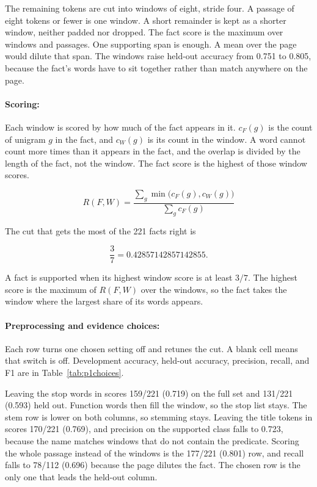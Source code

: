 \documentclass[12pt,a4paper]{article}
\begin{document}
The remaining tokens are cut into windows of eight, stride four. A passage of eight tokens or fewer is one window. A short remainder is kept as a shorter window, neither padded nor dropped. The fact score is the maximum over windows and passages. One supporting span is enough. A mean over the page would dilute that span. The windows raise held-out accuracy from 0.751 to 0.805, because the fact's words have to sit together rather than match anywhere on the page.

\paragraph{Scoring:}

Each window is scored by how much of the fact appears in it. \(c_F(g)\) is the count of unigram \(g\) in the fact, and \(c_W(g)\) is its count in the window. A word cannot count more times than it appears in the fact, and the overlap is divided by the length of the fact, not the window. The fact score is the highest of those window scores.

\begin{equation}
R(F,W)=\frac{\sum_{g}\min\bigl(c_F(g),c_W(g)\bigr)}{\sum_{g}c_F(g)}
\end{equation}

The cut that gets the most of the 221 facts right is

\[
\frac{3}{7} = 0.42857142857142855.
\]

A fact is supported when its highest window score is at least \(3/7\). The highest score is the maximum of \(R(F,W)\) over the windows, so the fact takes the window where the largest share of its words appears.

\paragraph{Preprocessing and evidence choices:}

Each row turns one chosen setting off and retunes the cut. A blank cell means that switch is off. Development accuracy, held-out accuracy, precision, recall, and F1 are in Table~\ref{tab:p1choices}.

Leaving the stop words in scores 159/221 (0.719) on the full set and 131/221 (0.593) held out. Function words then fill the window, so the stop list stays. The stem row is lower on both columns, so stemming stays. Leaving the title tokens in scores 170/221 (0.769), and precision on the supported class falls to 0.723, because the name matches windows that do not contain the predicate. Scoring the whole passage instead of the windows is the 177/221 (0.801) row, and recall falls to 78/112 (0.696) because the page dilutes the fact. The chosen row is the only one that leads the held-out column.
\end{document}
